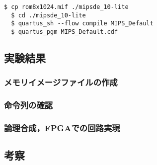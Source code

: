 \begin{lstlisting}[caption={コンパイル，ダウンロード},label={コンパイル，ダウンロード2-2}]
  $ cp rom8x1024.mif ./mipsde_10-lite
  $ cd ./mipsde_10-lite
  $ quartus_sh --flow compile MIPS_Default
  $ quartus_pgm MIPS_Default.cdf 
\end{lstlisting}

\subsection{実験結果}
\subsubsection{メモリイメージファイルの作成}

\subsubsection{命令列の確認}

\subsubsection{論理合成，FPGAでの回路実現}

\subsection{考察}
